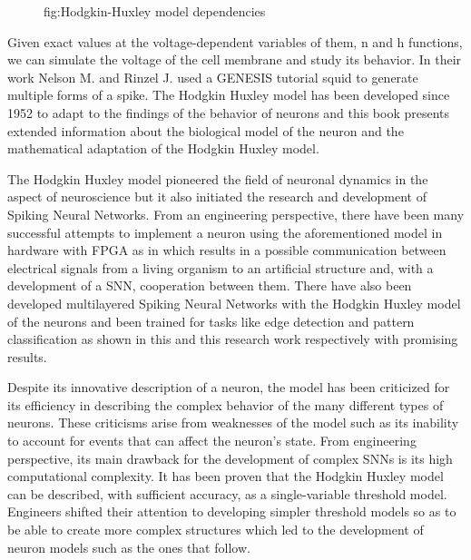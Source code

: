 \documentclass[12pt]{report}
\begin{document}
\begin{figure}[htp]
    \centering
    \hfill
    \caption{fig:Hodgkin-Huxley model dependencies}
\end{figure}

Given exact values at the voltage-dependent variables of them, n and h functions, we can simulate the voltage of the cell membrane and study its behavior. In their work \cite{NelsonM} Nelson M. and Rinzel J. used a GENESIS tutorial squid \cite{squid} to generate multiple forms of a spike. The Hodgkin Huxley model has been developed since 1952 to adapt to the findings of the behavior of neurons and this book \cite{gerstner2014} presents extended information about the biological model of the neuron and the mathematical adaptation of the Hodgkin Huxley model.

The Hodgkin Huxley model pioneered the field of neuronal dynamics in the aspect of neuroscience but it also initiated the research and development of Spiking Neural Networks. From an engineering perspective, there have been many successful attempts to implement a neuron using the aforementioned model in hardware with FPGA as in \cite{Levi2018} which results in a possible communication between electrical signals from a living organism to an artificial structure and, with a development of a SNN, cooperation between them. There have also been developed multilayered Spiking Neural Networks with the Hodgkin Huxley model of the neurons and been trained for tasks like edge detection and pattern classification as shown in this \cite{Yedjour2017} and this \cite{pattern2016} research work respectively with promising results.

Despite its innovative description of a neuron, the model has been criticized for its efficiency in describing the complex behavior of the many different types of neurons. These criticisms arise from weaknesses of the model such as its inability to account for events that can affect the neuron's state\cite{limit1993}. From engineering perspective, its main drawback for the development of complex SNNs is its high computational complexity. It has been proven \cite{reduction1997} that the Hodgkin Huxley model can be described, with sufficient accuracy, as a single-variable threshold model. Engineers shifted their attention to developing simpler threshold models so as to be able to create more complex structures which led to the development of neuron models such as the ones that follow.
\end{document}
